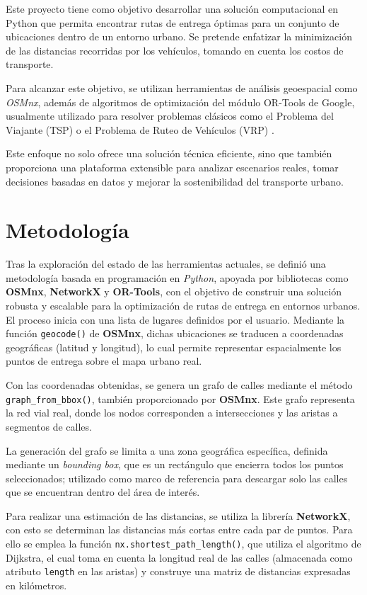 \documentclass[a4paper,12pt]{article}
\begin{document}
Este proyecto tiene como objetivo desarrollar una solución computacional en Python que permita encontrar rutas de entrega óptimas para un conjunto de ubicaciones dentro de un entorno urbano. Se pretende enfatizar la minimización de las distancias recorridas por los vehículos, tomando en cuenta los costos de transporte.

Para alcanzar este objetivo, se utilizan herramientas de análisis geoespacial como \textit{OSMnx}, además de algoritmos de optimización del módulo OR-Tools de Google, usualmente utilizado para resolver problemas clásicos como el Problema del Viajante (TSP) o el Problema de Ruteo de Vehículos (VRP) \cite{google2023}.

Este enfoque no solo ofrece una solución técnica eficiente, sino que también proporciona una plataforma extensible para analizar escenarios reales, tomar decisiones basadas en datos y mejorar la sostenibilidad del transporte urbano.


\section{Metodología}

Tras la exploración del estado de las herramientas actuales, se definió una metodología basada en programación en \textit{Python}, apoyada por bibliotecas como \textbf{OSMnx}, \textbf{NetworkX} y \textbf{OR-Tools}, con el objetivo de construir una solución robusta y escalable para la optimización de rutas de entrega en entornos urbanos. 
El proceso inicia con una lista de lugares definidos por el usuario. Mediante la función \texttt{geocode()} de \textbf{OSMnx}, dichas ubicaciones se traducen a coordenadas geográficas (latitud y longitud), lo cual permite representar espacialmente los puntos de entrega sobre el mapa urbano real.

Con las coordenadas obtenidas, se genera un grafo de calles mediante el método \texttt{graph\_from\_bbox()}, también proporcionado por \textbf{OSMnx}. Este grafo representa la red vial real, donde los nodos corresponden a intersecciones y las aristas a segmentos de calles. 

La generación del grafo se limita a una zona geográfica específica, definida mediante un \textit{bounding box}, que es un rectángulo que encierra todos los puntos seleccionados; utilizado como marco de referencia para descargar solo las calles que se encuentran dentro del área de interés.


Para realizar una estimación de las distancias, se utiliza la librería \textbf{NetworkX}, con esto se determinan las distancias más cortas entre cada par de puntos. Para ello se emplea la función \texttt{nx.shortest\_path\_length()}, que utiliza el algoritmo de Dijkstra, el cual toma en cuenta la longitud real de las calles (almacenada como atributo \texttt{length} en las aristas) y construye una matriz de distancias expresadas en kilómetros. 
\end{document}
